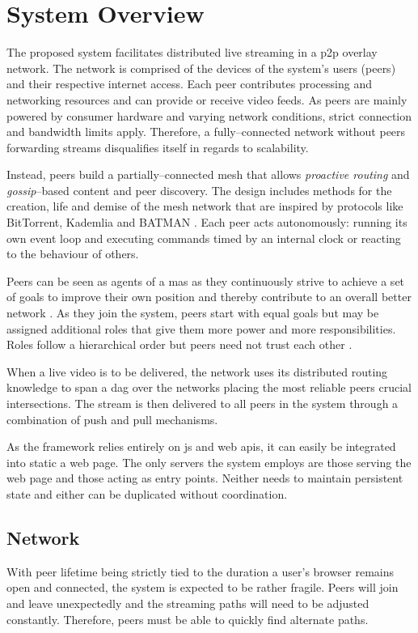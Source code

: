 \section{System Overview}\label{sec:design-system-overview}

The proposed system facilitates distributed live streaming in a \gls{p2p} overlay network. The network is comprised of the devices of the system's users (peers) and their respective internet access. Each peer contributes processing and networking resources and can provide or receive video feeds. As peers are mainly powered by consumer hardware and varying network conditions, strict connection and bandwidth limits apply. Therefore, a fully–connected network without peers forwarding streams disqualifies itself in regards to scalability.

Instead, peers build a partially–connected mesh that allows \textit{proactive routing} and \textit{gossip}–based content and peer discovery. The design includes methods for the creation, life and demise of the mesh network that are inspired by protocols like BitTorrent, Kademlia and BATMAN \cite{TODO}. Each peer acts autonomously: running its own event loop and executing commands timed by an internal clock or reacting to the behaviour of others.

Peers can be seen as agents of a \gls{mas} \cite{TODO-multiagent} as they continuously strive to achieve a set of goals to improve their own position and thereby contribute to an overall better network \cite{convergance}.
As they join the system, peers start with equal goals but may be assigned additional roles that give them more power and more responsibilities. Roles follow a hierarchical order but peers need not trust each other \cite{hmmmm-TODO}.

When a live video is to be delivered, the network uses its distributed routing knowledge to span a \gls{dag} over the networks placing the most reliable peers crucial intersections. The stream is then delivered to all peers in the system through a combination of push and pull mechanisms.

As the framework relies entirely on \gls{js} and web \glspl{api}, it can easily be integrated into static a web page. The only servers the system employs are those serving the web page and those acting as entry points. Neither needs to maintain persistent state and either can be duplicated without coordination.

\subsection{Network}
With peer lifetime being strictly tied to the duration a user's browser remains open and connected, the system is expected to be rather fragile. Peers will join and leave unexpectedly and the streaming paths will need to be adjusted constantly. Therefore, peers must be able to quickly find alternate paths.

